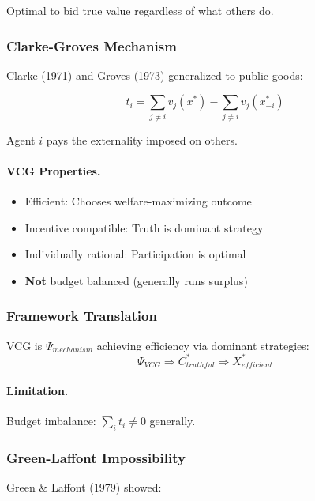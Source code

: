 Optimal to bid true value regardless of what others do.

\subsubsection{Clarke-Groves Mechanism}

Clarke (1971) and Groves (1973) generalized to public goods:

\begin{equation}
\boxed{
t_i = \sum_{j \neq i} v_j(x^*) - \sum_{j \neq i} v_j(x^*_{-i})
}
\label{eq:vcg}
\end{equation}

Agent $i$ pays the externality imposed on others.

\paragraph{VCG Properties.}
\begin{itemize}
    \item Efficient: Chooses welfare-maximizing outcome
    \item Incentive compatible: Truth is dominant strategy
    \item Individually rational: Participation is optimal
    \item \textbf{Not} budget balanced (generally runs surplus)
\end{itemize}

\subsubsection{Framework Translation}

VCG is $\Psi_{mechanism}$ achieving efficiency via dominant strategies:
\begin{equation}
\Psi_{VCG} \Rightarrow C^*_{truthful} \Rightarrow X^*_{efficient}
\end{equation}

\paragraph{Limitation.}
Budget imbalance: $\sum_i t_i \neq 0$ generally.

\subsubsection{Green-Laffont Impossibility}

Green \& Laffont (1979) showed:

